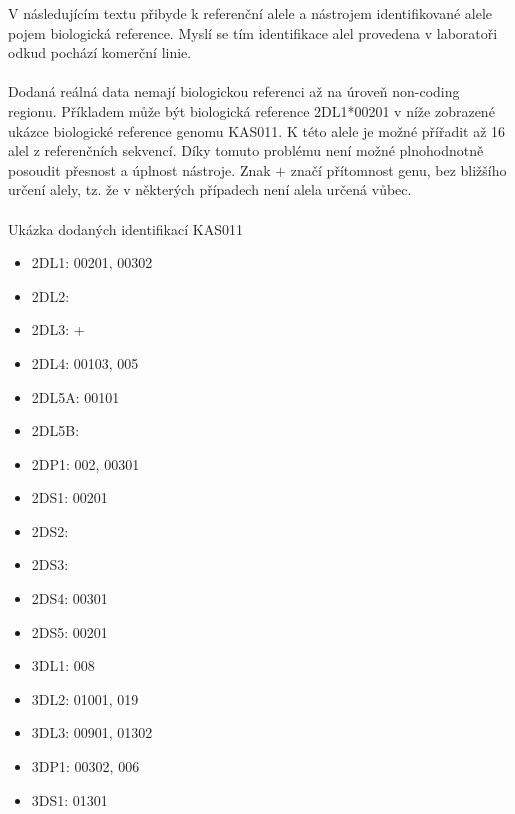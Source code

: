 \documentclass[czech,DP]{thesiskiv}
\numberwithin{equation}{section}
\begin{document}
\begin{center}
\label{tab:cut_quality}
\end{center}

\noindent
V následujícím textu přibyde k referenční alele a nástrojem identifikované alele pojem biologická reference. Myslí se tím identifikace alel provedena v laboratoři odkud pochází komerční linie.
\\
\\
Dodaná reálná data nemají biologickou referenci až na úroveň non-coding regionu. Příkladem může být biologická reference 2DL1*00201 v níže zobrazené ukázce biologické reference genomu KAS011. K této alele je možné přířadit až 16 alel z referenčních sekvencí. Díky tomuto problému není možné plnohodnotně posoudit přesnost a úplnost nástroje. Znak $+$ značí přítomnost genu, bez bližšího určení alely, tz. že v některých případech není alela určená vůbec.
\\
\\
\noindent 
Ukázka dodaných identifikací KAS011
\begin{multicols}{2}
\begin{itemize}
	\itemsep0em
	\item 2DL1: 00201, 00302
	\item 2DL2:
	\item 2DL3: +
	\item 2DL4: 00103, 005
	\item 2DL5A: 00101
	\item 2DL5B:
	\item 2DP1: 002, 00301
	\item 2DS1: 00201
	\item 2DS2:
	\item 2DS3:
	\item 2DS4: 00301
	\item 2DS5: 00201
	\item 3DL1: 008
	\item 3DL2: 01001, 019
	\item 3DL3: 00901, 01302
	\item 3DP1: 00302, 006
	\item 3DS1: 01301
\end{itemize}
\end{multicols}
\end{document}
